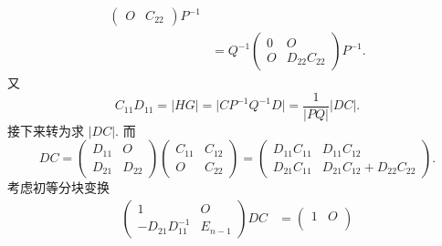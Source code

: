 \begin{exercise}
\begin{exgroup}
\begin{answer}
\begin{enumerate}
\begin{enumerate}
\begin{align*}
\begin{pmatrix}
                                        O      & C_{22}
                                    \end{pmatrix} P^{-1}               \\
                                      & = Q^{-1} \begin{pmatrix}
                                                     0 & O            \\
                                                     O & D_{22}C_{22}
                                                 \end{pmatrix} P^{-1}.
                                \end{align*}
                                又
                                \[C_{11}D_{11} = \lvert HG \rvert = \lvert CP^{-1}Q^{-1}D \rvert = \dfrac{1}{\lvert PQ \rvert}\lvert DC \rvert.\]
                                接下来转为求 $\lvert DC \rvert$. 而
                                \[DC = \begin{pmatrix}
                                        D_{11} & O      \\
                                        D_{21} & D_{22}
                                    \end{pmatrix} \begin{pmatrix}
                                        C_{11} & C_{12} \\
                                        O      & C_{22}
                                    \end{pmatrix} = \begin{pmatrix}
                                        D_{11}C_{11} & D_{11}C_{12}              \\
                                        D_{21}C_{11} & D_{21}C_{12}+D_{22}C_{22}
                                    \end{pmatrix}.\]
                                考虑初等分块变换
                                \begin{align*}
                                    \begin{pmatrix}
                                        1                  & O       \\
                                        -D_{21}D_{11}^{-1} & E_{n-1}
                                    \end{pmatrix}DC
                                     & = \begin{pmatrix}
                                             1                  & O       \\

\end{pmatrix}
\end{align*}
\end{enumerate}
\end{enumerate}
\end{answer}
\end{exgroup}
\end{exercise}
